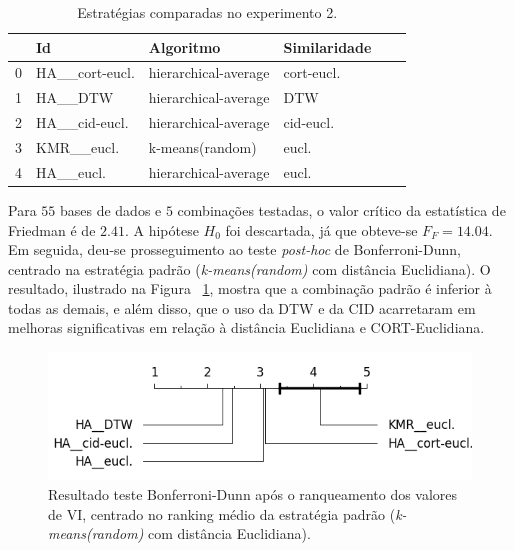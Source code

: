 	\begin{table}		
	\centering
	\begin{tabular}{llllll}
		\toprule
		{} &              Id &             Algoritmo &      Similaridade \\
		\midrule
		0 &  HA\_\_cort-eucl. &  hierarchical-average &       cort-eucl. \\
		1 &         HA\_\_DTW &  hierarchical-average &        DTW \\
		2 &   HA\_\_cid-eucl. &  hierarchical-average &        cid-eucl. \\
		3 &      KMR\_\_eucl. &               k-means(random) &              eucl. \\
		4 &       HA\_\_eucl. &  hierarchical-average &         eucl. \\
		\bottomrule
	\end{tabular}
	\caption{Estratégias comparadas no experimento 2.}  \label{tbl:2} 
		\end{table}

Para $55$ bases de dados e $5$ combinações testadas, o valor crítico da estatística 
de Friedman é de $2.41$. A hipótese $H_0$ foi descartada, já que obteve-se $F_F=14.04$. Em seguida, 
deu-se prosseguimento ao teste \emph{post-hoc} de Bonferroni-Dunn, centrado na estratégia padrão (\emph{k-means(random)} com distância Euclidiana). O resultado, 
ilustrado na Figura ~\ref{fig:VIP2}, mostra que a combinação padrão é inferior à todas as demais, 
e além disso, que o uso da DTW e da CID acarretaram em melhoras significativas em relação à distância 
Euclidiana e CORT-Euclidiana. \\

\begin{figure}[h!]
	\includegraphics[width=\linewidth]{figuras/figure_combinacoes_2.png}
	\caption{Resultado teste Bonferroni-Dunn após o ranqueamento dos valores de VI, centrado no ranking médio da estratégia padrão (\emph{k-means(random)} com distância Euclidiana).}
	\label{fig:VIP2}
\end{figure}

